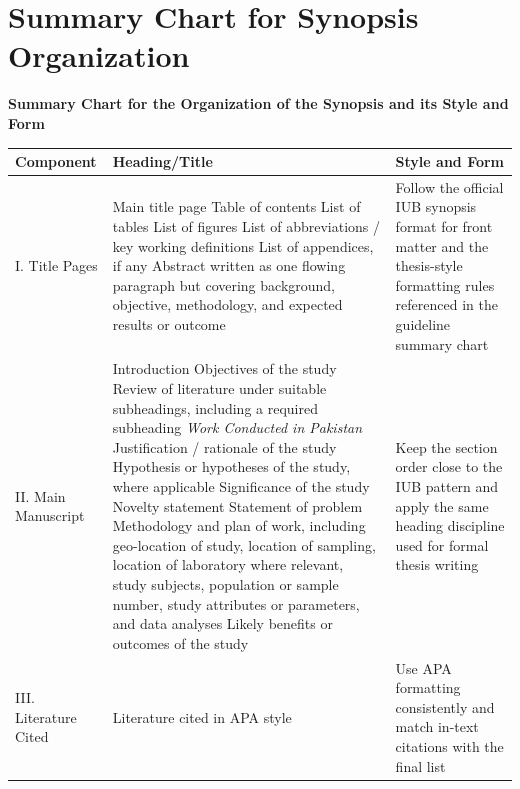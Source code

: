\documentclass[11pt,a4paper]{article}
\begin{document}
\section{Summary Chart for Synopsis Organization}

\begin{center}
{\Large\bfseries\textcolor{primary}{Summary Chart for the Organization of the Synopsis and its Style and Form}}
\end{center}

\renewcommand{\arraystretch}{1.2}
\begin{longtable}{|L{2.8cm}|L{7.9cm}|L{3.0cm}|}
\hline
\textbf{Component} & \textbf{Heading/Title} & \textbf{Style and Form} \\
\hline
I. Title Pages &
Main title page\newline
Table of contents\newline
List of tables\newline
List of figures\newline
List of abbreviations / key working definitions\newline
List of appendices, if any\newline
Abstract written as one flowing paragraph but covering background, objective, methodology, and expected results or outcome &
Follow the official IUB synopsis format for front matter and the thesis-style formatting rules referenced in the guideline summary chart \\
\hline
II. Main Manuscript &
Introduction\newline
Objectives of the study\newline
Review of literature under suitable subheadings, including a required subheading \emph{Work Conducted in Pakistan}\newline
Justification / rationale of the study\newline
Hypothesis or hypotheses of the study, where applicable\newline
Significance of the study\newline
Novelty statement\newline
Statement of problem\newline
Methodology and plan of work, including geo-location of study, location of sampling, location of laboratory where relevant, study subjects, population or sample number, study attributes or parameters, and data analyses\newline
Likely benefits or outcomes of the study &
Keep the section order close to the IUB pattern and apply the same heading discipline used for formal thesis writing \\
\hline
III. Literature Cited &
Literature cited in APA style &
Use APA formatting consistently and match in-text citations with the final list \\
\hline
\end{longtable}
\renewcommand{\arraystretch}{1.0}
\end{document}
